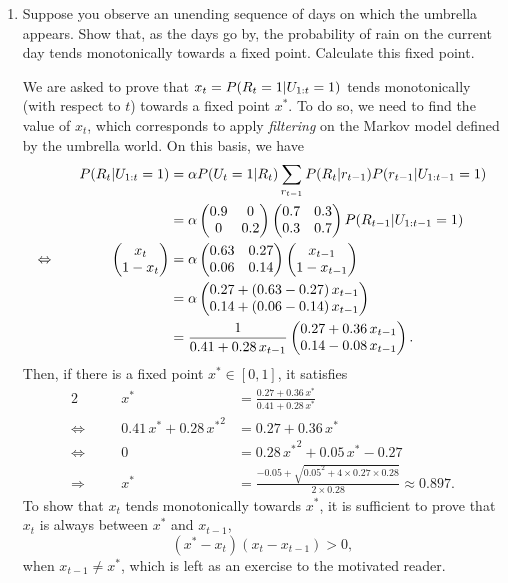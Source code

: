 \documentclass[11pt, a4paper]{article}
\begin{document}
\begin{enumerate}
    \item Suppose you observe an unending sequence of days on which the umbrella appears. Show that, as the days go by, the probability of rain on the current day tends monotonically towards a fixed point. Calculate this fixed point.

    \begin{solution}
        We are asked to prove that $x_t = P(R_t = 1 \vert U_{1:t} = 1)$ tends monotonically (with respect to $t$) towards a fixed point $x^*$. To do so, we need to find the value of $x_t$, which corresponds to apply \emph{filtering} on the Markov model defined by the umbrella world. On this basis, we have
        \begin{alignat*}{2}
            && P(R_t \vert U_{1:t} = 1) & = \alpha P(U_t = 1 \vert R_t) \sum_{r_{t-1}} P(R_t \vert r_{t-1}) P(r_{t-1} \vert U_{1:t-1}  = 1) \\
            &&& = \alpha \begin{pmatrix}0.9 & 0 \\ 0 & 0.2\end{pmatrix} \begin{pmatrix}0.7 & 0.3 \\ 0.3 & 0.7\end{pmatrix} P(R_{t-1} \vert U_{1:t-1} = 1) \\
            \Leftrightarrow \quad && \begin{pmatrix}x_{t} \\ 1 - x_{t}\end{pmatrix} & = \alpha \begin{pmatrix}0.63 & 0.27 \\ 0.06 & 0.14\end{pmatrix} \begin{pmatrix}x_{t-1} \\ 1 - x_{t-1}\end{pmatrix} \\
            &&& = \alpha \begin{pmatrix}0.27 + (0.63 - 0.27) \, x_{t-1} \\ 0.14 + (0.06 - 0.14) \, x_{t-1}\end{pmatrix} \\
            &&& = \frac{1}{0.41 + 0.28 \, x_{t-1}} \begin{pmatrix}0.27 + 0.36 \, x_{t-1} \\ 0.14 - 0.08 \, x_{t-1}\end{pmatrix} .
        \end{alignat*}
        Then, if there is a fixed point $x^* \in [0, 1]$, it satisfies
        \begin{alignat*}{2}
            && x^* & = \frac{0.27 + 0.36 \, x^*}{0.41 + 0.28 \, x^*} \\
            \Leftrightarrow \quad && 0.41 \, x^* + 0.28 \, {x^*}^2 & = 0.27 + 0.36 \, x^* \\
            \Leftrightarrow \quad && 0 & = 0.28 \, {x^*}^2 + 0.05 \, x^* - 0.27 \\
            \Rightarrow \quad && x^* & = \frac{-0.05 + \sqrt{0.05^2 + 4 \times 0.27 \times 0.28}}{2 \times 0.28} \approx \num{0.897} .
        \end{alignat*}
        To show that $x_t$ tends monotonically towards $x^*$, it is sufficient to prove that $x_t$ is always between $x^*$ and $x_{t-1}$, \ie{}
        \begin{equation*}
            (x^* - x_t) (x_t - x_{t-1}) > 0,
        \end{equation*}
        when $x_{t-1} \neq x^*$, which is left as an exercise to the motivated reader.
    \end{solution}


\end{enumerate}
\end{document}

